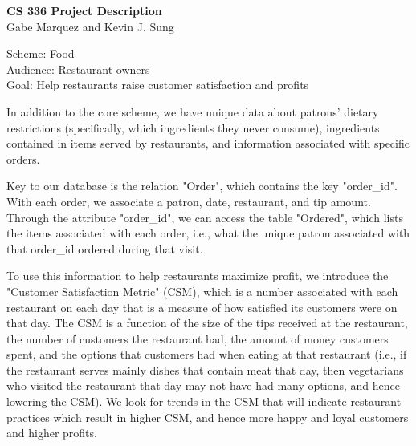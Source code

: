 \documentclass[11pt]{article}
\begin{document}
\begin{center}
    \textbf{CS 336 Project Description} \\
    Gabe Marquez and Kevin J. Sung
\end{center}

\begin{flushleft}
    Scheme: Food\\
    Audience: Restaurant owners\\
    Goal: Help restaurants raise customer satisfaction and profits\\
\end{flushleft}

In addition to the core scheme, we have unique data about patrons' dietary restrictions
(specifically, which ingredients they never consume),
ingredients contained in items served by restaurants, and information associated
with specific orders.

Key to our database is the relation "Order", which contains the key "order\_id".
With each order, we associate a patron, date, restaurant, and tip amount. Through
the attribute "order\_id", we can access the table "Ordered", which lists
the items associated with each order, i.e., what the unique patron associated with
that order\_id ordered during that visit.

To use this information to help restaurants maximize profit, we introduce the
"Customer Satisfaction Metric" (CSM), which is a number associated with each restaurant
on each day that is a measure of how satisfied its customers were on that day.
The CSM is a function of the size of the tips received at the restaurant, the
number of customers the restaurant had, the amount of money customers spent, and
the options that customers had when eating at that restaurant (i.e., if the restaurant
serves mainly dishes that contain meat that day, then vegetarians who visited the restaurant
that day may not have had many options, and hence lowering the CSM). We look for
trends in the CSM that will indicate restaurant practices which result in higher CSM,
and hence more happy and loyal customers and higher profits.
\end{document}
